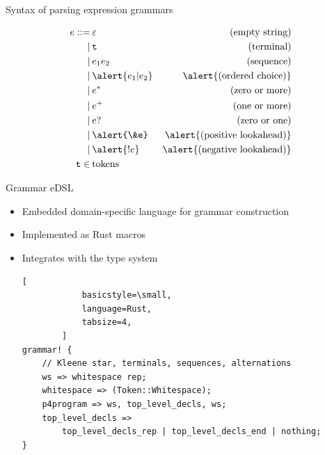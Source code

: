 \documentclass[aspectratio=169]{beamer}
\begin{document}
\begin{frame}{Syntax of parsing expression grammars}
	\centering
	\begin{overprint}
	\begin{align*}
		e ::= & \hspace{2pt} \varepsilon & \text{(empty string)} \\
		\mid  & \hspace{2pt} \texttt{t}  & \text{(terminal)} \\
		\mid  & \hspace{2pt} e_1 e_2     & \text{(sequence)} \\
		\mid  & \hspace{2pt} \alert{e_1 | e_2} & \alert{\text{(ordered choice)}} \\
		\mid  & \hspace{2pt} e^*         & \text{(zero or more)} \\
		\mid  & \hspace{2pt} e^+         & \text{(one or more)} \\
		\mid  & \hspace{2pt} e?          & \text{(zero or one)} \\
		\mid  & \hspace{2pt} \alert{\&e} & \alert{\text{(positive lookahead)}} \\
		\mid  & \hspace{2pt} \alert{!e}  & \alert{\text{(negative lookahead)}} \\
		\texttt{t} \in & \hspace{2pt} \text{tokens}
	\end{align*}
	\end{overprint}
\end{frame}


\begin{frame}[fragile]{Grammar eDSL}
	\begin{itemize}
		\item Embedded domain-specific language for \alert{grammar construction}
		\pause
		\item Implemented as Rust macros \pause
		\item Integrates with the type system \pause
		\begin{lstlisting}[
			basicstyle=\small,
			language=Rust,
			tabsize=4,
		]
grammar! {
	// Kleene star, terminals, sequences, alternations
	ws => whitespace rep;
	whitespace => (Token::Whitespace);
	p4program => ws, top_level_decls, ws;
	top_level_decls =>
		top_level_decls_rep | top_level_decls_end | nothing;
}
		\end{lstlisting}
	\end{itemize}
\end{frame}
\end{document}
